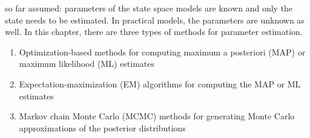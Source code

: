 so far assumed: parameters of the state space models are known and only the state needs to be estimated. In practical models, the parameters are unknown as well. In this chapter, there are three types of methods for parameter estimation. 
\begin{enumerate}
    \item Optimization-based methods for computing maximum a posteriori (MAP) or maximum likelihood (ML) estimates
    \item Expectation-maximization (EM) algorithms for computing the MAP or ML estimates
    \item Markov chain Monte Carlo (MCMC) methods for generating Monte Carlo approximations of the posterior distributions
\end{enumerate}
